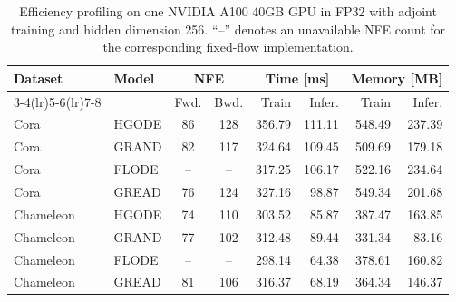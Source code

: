 \documentclass{article}
\theoremstyle{plain}
\theoremstyle{definition}
\theoremstyle{remark}
\begin{document}
\begin{table}[H]
    \caption{Efficiency profiling on one NVIDIA A100 40GB GPU in FP32 with adjoint training and hidden dimension 256. ``--'' denotes an unavailable NFE count for the corresponding fixed-flow implementation.}
    \label{tab:efficiency}
    \centering
    {\footnotesize
        \setlength{\tabcolsep}{4pt}
        \renewcommand{\arraystretch}{1.05}
        \begin{tabular}{llccrrrr}
            \toprule
            Dataset       & Model & \multicolumn{2}{c}{NFE} & \multicolumn{2}{c}{Time [ms]} & \multicolumn{2}{c}{Memory [MB]}                              \\
            \cmidrule(lr){3-4}\cmidrule(lr){5-6}\cmidrule(lr){7-8}
                          &       & Fwd.                    & Bwd.                          & Train                           & Infer. & Train   & Infer.  \\
            \midrule
            Cora          & HGODE & 86                      & 128                           & 356.79                          & 111.11 & 548.49  & 237.39  \\
            Cora          & GRAND & 82                      & 117                           & 324.64                          & 109.45 & 509.69  & 179.18  \\
            Cora          & FLODE & --                      & --                            & 317.25                          & 106.17 & 522.16  & 234.64  \\
            Cora          & GREAD & 76                      & 124                           & 327.16                          & 98.87  & 549.34  & 201.68  \\
            \midrule
            Chameleon     & HGODE & 74                      & 110                           & 303.52                          & 85.87  & 387.47  & 163.85  \\
            Chameleon     & GRAND & 77                      & 102                           & 312.48                          & 89.44  & 331.34  & 83.16   \\
            Chameleon     & FLODE & --                      & --                            & 298.14                          & 64.38  & 378.61  & 160.82  \\
            Chameleon     & GREAD & 81                      & 106                           & 316.37                          & 68.19  & 364.34  & 146.37  \\
            \midrule

\end{tabular}}
\end{table}
\end{document}
